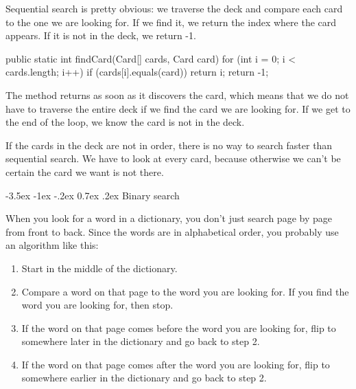 \documentclass[12pt]{book}
\makeatletter
\theoremstyle{exercise}
\newcommand{\java}[1]{\verb"#1"}
\renewcommand{\section}{\@startsection{section}{1}{\z@}%
    {-3.5ex \@plus -1ex \@minus -.2ex}%
    {0.7ex \@plus.2ex}%
    {\normalfont\Large\bfseries}}
\newcommand{\java}[1]{\lstinline{#1}} %
\makeatother
\begin{document}

Sequential search is pretty obvious: we traverse the deck and compare each card to the one we are looking for.
If we find it, we return the index where the card appears.
If it is not in the deck, we return -1.

\begin{code}
public static int findCard(Card[] cards, Card card) {
    for (int i = 0; i < cards.length; i++) {
        if (cards[i].equals(card)) {
            return i;
        }
    }
    return -1;
}
\end{code}



The method returns as soon as it discovers the card, which means that we do not have to traverse the entire deck if we find the card we are looking for.
If we get to the end of the loop, we know the card is not in the deck.

If the cards in the deck are not in order, there is no way to search faster than sequential search.
We have to look at every card, because otherwise we can't be certain the card we want is not there.



\section{Binary search}

When you look for a word in a dictionary, you don't just search page by page from front to back.
Since the words are in alphabetical order, you probably use an algorithm like this:

\begin{enumerate}
\item Start in the middle of the dictionary.
\item Compare a word on that page to the word you are looking for.
If you find the word you are looking for, then stop.
\item If the word on that page comes before the word you are looking for, flip to somewhere later in the dictionary and go back to step 2.
\item If the word on that page comes after the word you are looking for, flip to somewhere earlier in the dictionary and go back to step 2.
\end{enumerate}
\end{document}
